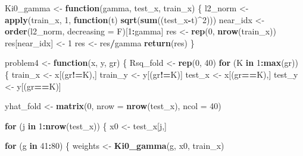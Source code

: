 \documentclass[
]{article}
\newenvironment{Shaded}{\begin{snugshade}}{\end{snugshade}}
\newcommand{\AttributeTok}[1]{\textcolor[rgb]{0.13,0.29,0.53}{#1}}
\newcommand{\ControlFlowTok}[1]{\textcolor[rgb]{0.13,0.29,0.53}{\textbf{#1}}}
\newcommand{\DecValTok}[1]{\textcolor[rgb]{0.00,0.00,0.81}{#1}}
\newcommand{\FunctionTok}[1]{\textcolor[rgb]{0.13,0.29,0.53}{\textbf{#1}}}
\newcommand{\NormalTok}[1]{#1}
\newcommand{\OtherTok}[1]{\textcolor[rgb]{0.56,0.35,0.01}{#1}}
\newcommand{\SpecialCharTok}[1]{\textcolor[rgb]{0.81,0.36,0.00}{\textbf{#1}}}
\begin{document}
\begin{Shaded}
\begin{Highlighting}[]
\NormalTok{Ki0\_gamma }\OtherTok{\textless{}{-}} \ControlFlowTok{function}\NormalTok{(gamma, test\_x, train\_x) \{}
\NormalTok{  l2\_norm }\OtherTok{\textless{}{-}} \FunctionTok{apply}\NormalTok{(train\_x, }\DecValTok{1}\NormalTok{, }\ControlFlowTok{function}\NormalTok{(t) }\FunctionTok{sqrt}\NormalTok{(}\FunctionTok{sum}\NormalTok{((test\_x}\SpecialCharTok{{-}}\NormalTok{t)}\SpecialCharTok{\^{}}\DecValTok{2}\NormalTok{)))}
\NormalTok{  near\_idx }\OtherTok{\textless{}{-}} \FunctionTok{order}\NormalTok{(l2\_norm, }\AttributeTok{decreasing =}\NormalTok{ F)[}\DecValTok{1}\SpecialCharTok{:}\NormalTok{gamma]}
\NormalTok{  res }\OtherTok{\textless{}{-}} \FunctionTok{rep}\NormalTok{(}\DecValTok{0}\NormalTok{, }\FunctionTok{nrow}\NormalTok{(train\_x))}
\NormalTok{  res[near\_idx] }\OtherTok{\textless{}{-}} \DecValTok{1}
\NormalTok{  res }\OtherTok{\textless{}{-}}\NormalTok{ res}\SpecialCharTok{/}\NormalTok{gamma}
  \FunctionTok{return}\NormalTok{(res)}
\NormalTok{\}}

\NormalTok{problem4 }\OtherTok{\textless{}{-}} \ControlFlowTok{function}\NormalTok{(x, y, gr) \{}
\NormalTok{  Rsq\_fold }\OtherTok{\textless{}{-}} \FunctionTok{rep}\NormalTok{(}\DecValTok{0}\NormalTok{, }\DecValTok{40}\NormalTok{)}
  \ControlFlowTok{for}\NormalTok{ (K }\ControlFlowTok{in} \DecValTok{1}\SpecialCharTok{:}\FunctionTok{max}\NormalTok{(gr)) \{}
\NormalTok{    train\_x }\OtherTok{\textless{}{-}}\NormalTok{ x[(gr}\SpecialCharTok{!=}\NormalTok{K),]}
\NormalTok{    train\_y }\OtherTok{\textless{}{-}}\NormalTok{ y[(gr}\SpecialCharTok{!=}\NormalTok{K)]}
\NormalTok{    test\_x }\OtherTok{\textless{}{-}}\NormalTok{ x[(gr}\SpecialCharTok{==}\NormalTok{K),]}
\NormalTok{    test\_y }\OtherTok{\textless{}{-}}\NormalTok{ y[(gr}\SpecialCharTok{==}\NormalTok{K)]}
    
\NormalTok{    yhat\_fold }\OtherTok{\textless{}{-}} \FunctionTok{matrix}\NormalTok{(}\DecValTok{0}\NormalTok{, }\AttributeTok{nrow =} \FunctionTok{nrow}\NormalTok{(test\_x), }\AttributeTok{ncol =} \DecValTok{40}\NormalTok{)}
    
    \ControlFlowTok{for}\NormalTok{ (j }\ControlFlowTok{in} \DecValTok{1}\SpecialCharTok{:}\FunctionTok{nrow}\NormalTok{(test\_x)) \{}
\NormalTok{      x0 }\OtherTok{\textless{}{-}}\NormalTok{ test\_x[j,]}
      
      \ControlFlowTok{for}\NormalTok{ (g }\ControlFlowTok{in} \DecValTok{41}\SpecialCharTok{:}\DecValTok{80}\NormalTok{) \{}
\NormalTok{        weights }\OtherTok{\textless{}{-}} \FunctionTok{Ki0\_gamma}\NormalTok{(g, x0, train\_x)}
        

\end{Highlighting}
\end{Shaded}
\end{document}

